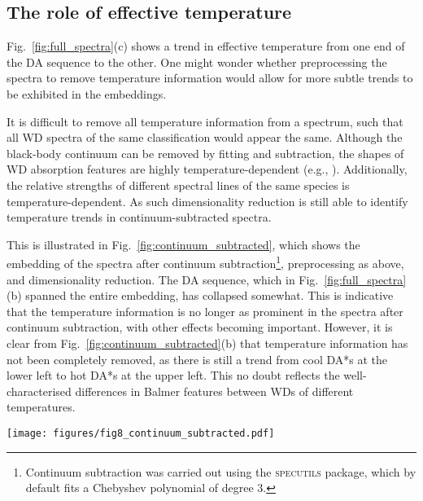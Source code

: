 \documentclass[fleqn,usenatbib]{mnras}
\def\Teff{T_\mathrm{eff}}
\begin{document}
\subsection{The role of effective temperature}
\label{sec:discteff}

Fig.~\ref{fig:full_spectra}(c) shows a trend in effective temperature from one end of the DA sequence to the other.
One might wonder whether preprocessing the spectra to remove temperature information would allow for more subtle trends to be exhibited in the embeddings.

It is difficult to remove all temperature information from a spectrum, such that all WD spectra of the same classification would appear the same.
Although the black-body continuum can be removed by fitting and subtraction, the shapes of WD absorption features are highly temperature-dependent (e.g., \citealt{liebert05, tremblay09}).
Additionally, the relative strengths of different spectral lines of the same species is temperature-dependent.
As such dimensionality reduction is still able to identify temperature trends in continuum-subtracted spectra.

This is illustrated in Fig.~\ref{fig:continuum_subtracted}, which shows the embedding of the spectra after continuum subtraction\footnote{
    Continuum subtraction was carried out using the \textsc{specutils} package, which by default fits a Chebyshev polynomial of degree 3.
}, preprocessing as above, and dimensionality reduction.
The DA sequence, which in Fig.~\ref{fig:full_spectra}(b) spanned the entire embedding, has collapsed somewhat.
This is indicative that the temperature information is no longer as prominent in the spectra after continuum subtraction, with other effects becoming important.
However, it is clear from Fig.~\ref{fig:continuum_subtracted}(b) that temperature information has not been completely removed, as there is still a trend from cool DA*s at the lower left to hot DA*s at the upper left.
This no doubt reflects the well-characterised differences in Balmer features between WDs of different temperatures.

\begin{figure*}
\texttt{[image: figures/fig8\_continuum\_subtracted.pdf]}
\caption{
    Dimensionality-reduced embedding of spectra following continuum subtraction.
    (a) Colour-coded according to the visual classification of \citet{manser24}, as in Fig.~\ref{fig:full_spectra}(b).
    The DA sequence has partially collapsed, but not entirely.
    (b) Colour-coded by $\Teff$, as in Fig.~\ref{fig:full_spectra}(c).
    There is still a temperature trend along the shorter DA sequence.
}
\label{fig:continuum_subtracted}
\end{figure*}
\end{document}
